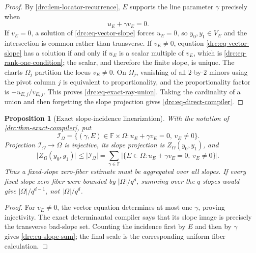 \documentclass[11pt,a4paper]{amsart}
\numberwithin{equation}{section}
\newtheorem{proposition}[proposition]{Proposition}
\theoremstyle{remark}
\newcommand{\F}{\mathbb F}
\newcommand{\Ical}{\mathcal I}
\newcommand{\abs}[1]{\lvert #1\rvert}
\begin{document}
\begin{proof}
By \cref{drc:lem-locator-recurrence}, \(E\) supports the line parameter
\(\gamma\) precisely when
\[
                         u_E+\gamma v_E=0.
                         \tag{DR8}\label{drc:eq-vector-slope}
\]
If \(v_E=0\), a solution of \eqref{drc:eq-vector-slope} forces \(u_E=0\),
so \(y_0,y_1\in V_E\) and the intersection is common rather than
transverse.  If \(v_E\ne0\), equation
\eqref{drc:eq-vector-slope} has a solution if and only if \(u_E\) is a
scalar multiple of \(v_E\), which is
\eqref{drc:eq-rank-one-condition}; the scalar, and therefore the finite
slope, is unique.  The charts \(\Omega_j\) partition the locus
\(v_E\ne0\).  On \(\Omega_j\), vanishing of all \(2\)-by-\(2\) minors
using the pivot column \(j\) is equivalent to proportionality, and the
proportionality factor is \(-u_{E,j}/v_{E,j}\).  This proves
\eqref{drc:eq-exact-ray-union}.  Taking the cardinality of a union and then
forgetting the slope projection gives \eqref{drc:eq-direct-compiler}.
\end{proof}

\begin{proposition}[Exact slope-incidence linearization]
\label{drc:prop-exact-slope-linearization}
With the notation of \cref{drc:thm-exact-compiler}, put
\[
 \Ical_\Omega=
 \{(\gamma,E)\in\F\times\Omega:
                 u_E+\gamma v_E=0,\ v_E\ne0\}.
 \tag{DRC1}\label{drc:eq-slope-incidence}
\]
Projection \(\Ical_\Omega\to\Omega\) is injective, its slope projection
is \(Z_\Omega(y_0,y_1)\), and
\[
 \abs{Z_\Omega(y_0,y_1)}
 \le\abs{\Ical_\Omega}
 =\sum_{\gamma\in\F}
   \abs{\{E\in\Omega:u_E+\gamma v_E=0,\ v_E\ne0\}}. \tag{DRC2}
\label{drc:eq-slope-sum}
\]
Thus a fixed-slope zero-fiber estimate must be aggregated over all slopes.
If every fixed-slope zero fiber were bounded by \(\abs\Omega/q^d\),
summing over the \(q\) slopes would give \(\abs\Omega/q^{d-1}\), not
\(\abs\Omega/q^d\).
\end{proposition}

\begin{proof}
For \(v_E\ne0\), the vector equation determines at most one
\(\gamma\), proving injectivity.  The exact determinantal compiler says
that its slope image is precisely the transverse bad-slope set.  Counting
the incidence first by \(E\) and then by \(\gamma\) gives
\eqref{drc:eq-slope-sum}; the final scale is the corresponding uniform
fiber calculation.
\end{proof}
\end{document}
